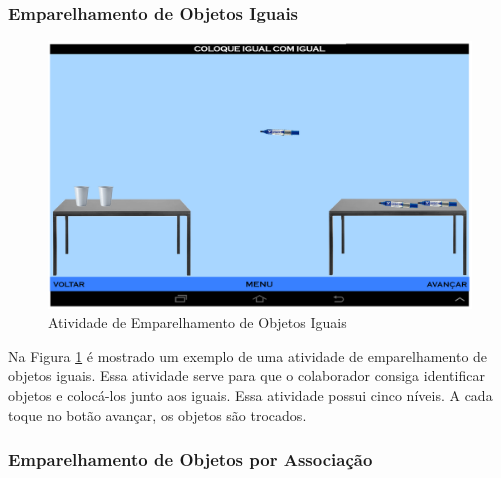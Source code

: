 \documentclass[12pt]{article}
\begin{document}
\subsubsection{Emparelhamento de Objetos Iguais}

 \begin{figure}[h!]
    \centering
    \includegraphics[width=1.0\textwidth]{emparelhamento_obj_igual.png}
    \caption{Atividade de Emparelhamento de Objetos Iguais}
    \label{fig:emparObjIgual}
\end{figure}
Na Figura \ref{fig:emparObjIgual} é mostrado um exemplo de uma atividade de emparelhamento de objetos
iguais. Essa atividade serve para que o colaborador consiga identificar objetos e colocá-los
junto aos iguais. Essa atividade possui cinco níveis. A cada toque no botão avançar, os
objetos são trocados.

\subsubsection{Emparelhamento de Objetos por Associação}
\end{document}
